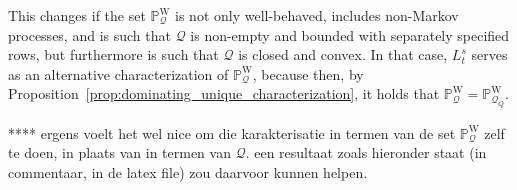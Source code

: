 \documentclass[10pt]{paper}
\theoremstyle{definition}
\newcommand{\processes}{\mathbb{P}}
\newcommand{\wprocesses}{\processes^{\mathrm{W}}}
\newcommand{\rateset}{\mathcal{Q}}
\newcommand{\lrate}{\underline{Q}}
\newcommand{\coloneqq}{:\!=}
\begin{document}
This changes if the set $\wprocesses_\rateset$ is not only well-behaved, includes non-Markov processes, and is such that $\rateset$ is non-empty and bounded with separately specified rows, but furthermore is such that $\rateset$ is closed and convex. In that case, $L_t^s$ serves as an alternative characterization of $\wprocesses_\rateset$, because then, by Proposition~\ref{prop:dominating_unique_characterization}, it holds that $\wprocesses_\rateset=\wprocesses_{\rateset_{\lrate}}$.

**** ergens voelt het wel nice om die karakterisatie in termen van de set $\wprocesses_\rateset$ zelf te doen, in plaats van in termen van $\rateset$. een resultaat zoals hieronder staat (in commentaar, in de latex file) zou daarvoor kunnen helpen.

%
%
%
\end{document}
